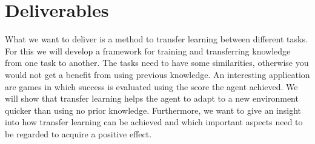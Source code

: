 \section{Deliverables}
\label{sec:deliverables}

What we want to deliver is a method to transfer learning between different tasks. For this we will develop a framework for training and transferring knowledge from one task to another. The tasks need to have some similarities, otherwise you would not get a benefit from using previous knowledge. An interesting application are games in which success is evaluated using the score the agent achieved. We will show that transfer learning helps the agent to adapt to a new environment quicker than using no prior knowledge. Furthermore, we want to give an insight into how transfer learning can be achieved and which important aspects need to be regarded to acquire a positive effect.
